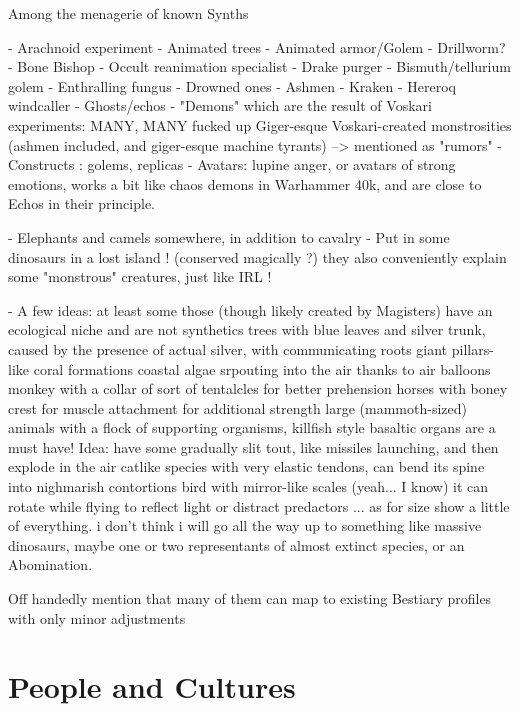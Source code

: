 Among the menagerie of known Synths


- Arachnoid experiment
- Animated trees
- Animated armor/Golem
- Drillworm?
- Bone Bishop
- Occult reanimation specialist
- Drake purger
- Bismuth/tellurium golem
- Enthralling fungus
- Drowned ones
- Ashmen
- Kraken
- Hereroq windcaller
- Ghosts/echos
- "Demons" which are the result of Voskari experiments:	MANY, MANY fucked up Giger-esque Voskari-created monstrosities (ashmen included, and giger-esque machine tyrants) –> mentioned as "rumors"
- Constructs : golems, replicas
- Avatars: lupine anger, or avatars of strong emotions, works a bit like chaos demons in Warhammer 40k, and are close to Echos in their principle.





- Elephants and camels somewhere, in addition to cavalry
- Put in some dinosaurs in a lost island ! (conserved magically ?) they also conveniently explain some "monstrous" creatures, just like IRL !

- A few ideas: at least some those (though likely created by Magisters) have an ecological niche and are not synthetics
	trees with blue leaves and silver trunk, caused by the presence of actual silver, with communicating roots
	giant pillars-like coral formations
	coastal algae srpouting into the air thanks to air balloons
	monkey with a collar of sort of tentalcles for better prehension
	horses with boney crest for muscle attachment for additional strength
	large (mammoth-sized) animals with a flock of supporting organisms, killfish style
	basaltic organs are a must have! Idea: have some gradually slit tout, like missiles launching, and then explode in the air
	catlike species with very elastic tendons, can bend its spine into nighmarish contortions
	bird with mirror-like scales (yeah... I know) it can rotate while flying to reflect light or distract predactors
... as for size show a little of everything. i don't think i will go all the way up to something like massive dinosaurs, maybe one or two representants of almost extinct species, or an Abomination.



Off handedly mention that many of them can map to existing Bestiary profiles with only minor adjustments



\section{People and Cultures}

